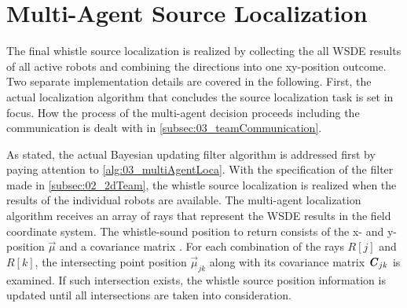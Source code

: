 \section{Multi-Agent Source Localization}
\label{sec:03_multiAgentLoca}

The final whistle source localization is realized by collecting the
all \ac{WSDE} results of all active robots and combining the directions
into one xy-position outcome.
Two separate implementation details are covered in the following.
First, the actual localization algorithm that concludes the source localization
task is set in focus.
How the process of the multi-agent decision proceeds including the communication
is dealt with in \cref{subsec:03_teamCommunication}.

As stated, the actual Bayesian updating filter algorithm is addressed first
by paying attention to \cref{alg:03_multiAgentLoca}.
With the specification of the filter made in \cref{subsec:02_2dTeam}, the
whistle source localization is realized when the results of the individual robots
are available.
The multi-agent localization algorithm receives an array of rays that represent
the \ac{WSDE} results in the field coordinate system.
The whistle-sound position to return consists of the x- and y-position $\vec{\mu}$ and
a covariance matrix .
For each combination of the rays $R[j]$ and $R[k]$, the intersecting point position
$\vec{\mu}_{jk}$ along with its covariance matrix $\textbf{\textit{C}}_{jk}$ is examined.
If such intersection exists, the whistle source position information is updated until all intersections are taken into consideration.

